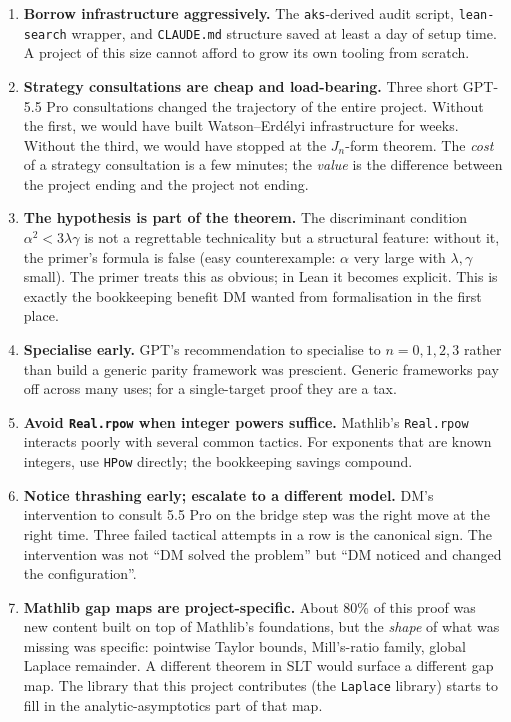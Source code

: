 \documentclass[11pt]{article}
\begin{document}
\begin{enumerate}
\item \textbf{Borrow infrastructure aggressively.} The
\texttt{aks}-derived audit script, \texttt{lean-search} wrapper, and
\texttt{CLAUDE.md} structure saved at least a day of setup time. A
project of this size cannot afford to grow its own tooling from scratch.

\item \textbf{Strategy consultations are cheap and load-bearing.} Three
short GPT-5.5 Pro consultations changed the trajectory of the entire
project. Without the first, we would have built Watson--Erd\'elyi
infrastructure for weeks. Without the third, we would have stopped at the
$J_n$-form theorem. The \emph{cost} of a strategy consultation is a few
minutes; the \emph{value} is the difference between the project ending
and the project not ending.

\item \textbf{The hypothesis is part of the theorem.} The discriminant
condition $\alpha^2 < 3\lambda\gamma$ is not a regrettable technicality
but a structural feature: without it, the primer's formula is false
(easy counterexample: $\alpha$ very large with $\lambda, \gamma$ small).
The primer treats this as obvious; in Lean it becomes explicit. This is
exactly the bookkeeping benefit DM wanted from formalisation in the
first place.

\item \textbf{Specialise early.} GPT's recommendation to specialise to
$n = 0,1,2,3$ rather than build a generic parity framework was
prescient. Generic frameworks pay off across many uses; for a
single-target proof they are a tax.

\item \textbf{Avoid \texttt{Real.rpow} when integer powers suffice.}
Mathlib's \texttt{Real.rpow} interacts poorly with several common
tactics. For exponents that are known integers, use \texttt{HPow}
directly; the bookkeeping savings compound.

\item \textbf{Notice thrashing early; escalate to a different model.}
DM's intervention to consult 5.5 Pro on the bridge step was the right
move at the right time. Three failed tactical attempts in a row is the
canonical sign. The intervention was not ``DM solved the problem'' but
``DM noticed and changed the configuration''.

\item \textbf{Mathlib gap maps are project-specific.} About 80\% of this
proof was new content built on top of Mathlib's foundations, but the
\emph{shape} of what was missing was specific: pointwise Taylor bounds,
Mill's-ratio family, global Laplace remainder. A different theorem in
SLT would surface a different gap map. The library that this project
contributes (the \texttt{Laplace} library) starts to fill in the
analytic-asymptotics part of that map.


\end{enumerate}
\end{document}
